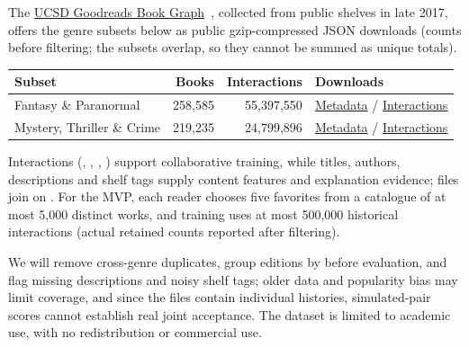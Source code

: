  The \href{https://cseweb.ucsd.edu/~jmcauley/datasets/goodreads.html}{UCSD Goodreads Book Graph}~\cite{wan2018, wan2019}, collected from public shelves in late 2017, offers the genre subsets below as public gzip-compressed JSON downloads (counts before filtering; the subsets overlap, so they cannot be summed as unique totals).

\begin{center}\vspace{-4pt}\tablestyle
\begin{tabular}{@{}lrrl@{}}
\toprule
Subset & Books & Interactions & Downloads \\
\midrule
Fantasy \& Paranormal & 258,585 & 55,397,550 & \href{https://mcauleylab.ucsd.edu/public_datasets/gdrive/goodreads/byGenre/goodreads_books_fantasy_paranormal.json.gz}{Metadata} / \href{https://mcauleylab.ucsd.edu/public_datasets/gdrive/goodreads/byGenre/goodreads_interactions_fantasy_paranormal.json.gz}{Interactions} \\
Mystery, Thriller \& Crime & 219,235 & 24,799,896 & \href{https://mcauleylab.ucsd.edu/public_datasets/gdrive/goodreads/byGenre/goodreads_books_mystery_thriller_crime.json.gz}{Metadata} / \href{https://mcauleylab.ucsd.edu/public_datasets/gdrive/goodreads/byGenre/goodreads_interactions_mystery_thriller_crime.json.gz}{Interactions} \\
\bottomrule
\end{tabular}\vspace{-4pt}
\end{center}

 Interactions (, , , ) support collaborative training, while titles, authors, descriptions and shelf tags supply content features and explanation evidence; files join on . For the MVP, each reader chooses five favorites from a catalogue of at most 5,000 distinct works, and training uses at most 500,000 historical interactions (actual retained counts reported after filtering).

 We will remove cross-genre duplicates, group editions by  before evaluation, and flag missing descriptions and noisy shelf tags; older data and popularity bias may limit coverage, and since the files contain individual histories, simulated-pair scores cannot establish real joint acceptance. The dataset is limited to academic use, with no redistribution or commercial use.
